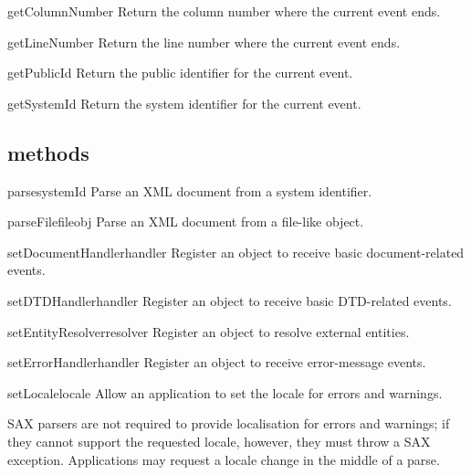 \documentclass{howto}
\begin{document}
\begin{methoddesc}{getColumnNumber}{}
Return the column number where the current event ends.
\end{methoddesc}

\begin{methoddesc}{getLineNumber}{}
Return the line number where the current event ends.
\end{methoddesc}

\begin{methoddesc}{getPublicId}{}
Return the public identifier for the current event.
\end{methoddesc}

\begin{methoddesc}{getSystemId}{}
Return the system identifier for the current event.
\end{methoddesc}

\subsection{ methods}

\begin{methoddesc}{parse}{systemId}
Parse an XML document from a system identifier.
\end{methoddesc}

\begin{methoddesc}{parseFile}{fileobj}
Parse an XML document from a file-like object.
\end{methoddesc}

\begin{methoddesc}{setDocumentHandler}{handler}
Register an object to receive basic document-related events.
\end{methoddesc}

\begin{methoddesc}{setDTDHandler}{handler}
Register an object to receive basic DTD-related events.
\end{methoddesc}

\begin{methoddesc}{setEntityResolver}{resolver}
Register an object to resolve external entities.
\end{methoddesc}

\begin{methoddesc}{setErrorHandler}{handler}
Register an object to receive error-message events.
\end{methoddesc}

\begin{methoddesc}{setLocale}{locale}
Allow an application to set the locale for errors and warnings. 
   
        SAX parsers are not required to provide localisation for errors
        and warnings; if they cannot support the requested locale,
        however, they must throw a SAX exception. Applications may
        request a locale change in the middle of a parse.
\end{methoddesc}
\end{document}
